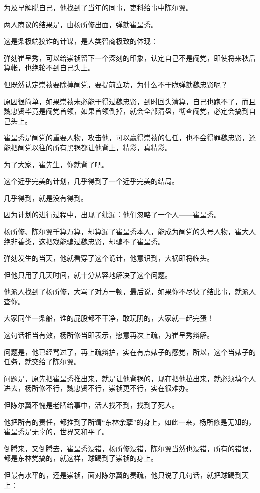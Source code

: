 \begin{multicols}{\theparacolNo}
为及早解脱自己，他找到了当年的同事，吏科给事中陈尔翼。

两人商议的结果是，由杨所修出面，弹劾崔呈秀。

这是条极端狡诈的计谋，是人类智商极致的体现：

弹劾崔呈秀，可以给崇祯留下一个深刻的印象，认定自己不是阉党，即使将来秋后算帐，也绝轮不到自己头上。

但既然认定崇祯要除掉阉党，要提前立功，为什么不干脆弹劾魏忠贤呢？

原因很简单，如果崇祯未必能干得过魏忠贤，到时回头清算，自己也跑不了，而且魏忠贤毕竟是阉党首领，如果首领倒掉，就会全部清盘，彻查阉党，必定会搞到自己头上。

崔呈秀是阉党的重要人物，攻击他，可以赢得崇祯的信任，也不会得罪魏忠贤，还能把阉党以往的所有黑锅都让他背上，精彩，真精彩。

为了大家，崔先生，你就背了吧。

这个近乎完美的计划，几乎得到了一个近乎完美的结局。

几乎得到，就是没有得到。

因为计划的进行过程中，出现了纰漏：他们忽略了一个人——崔呈秀。

杨所修、陈尔翼千算万算，却算漏了崔呈秀本人，能成为阉党的头号人物，崔大人绝非善类，这把戏能骗过魏忠贤，却骗不了崔呈秀。

弹劾发生的当天，他就看穿了这个诡计，他意识到，大祸即将临头。

但他只用了几天时间，就十分从容地解决了这个问题。

他派人找到了杨所修，大骂了对方一顿，最后说，如果你不尽快了结此事，就派人查你。

大家同坐一条船，谁的屁股都不干净，敢玩阴的，大家就一起完蛋！

这句话相当有效，杨所修当即表示，愿意再次上疏，为崔呈秀辩解。

问题是，他已经骂过了，再上疏辩护，实在有点婊子的感觉，所以，这个当婊子的任务，就交给了陈尔翼。

问题是，原先把崔呈秀推出来，就是让他背锅的，现在把他拉出来，就必须填个人进去，杨所修不行，魏忠贤不行，崇祯更不行，实在很难办。

但陈尔翼不愧是老牌给事中，活人找不到，找到了死人。

他把所有的责任，都推到了所谓“东林余孽”的身上，如此一来，杨所修是无知的，崔呈秀是无辜的，世界又和平了。

倒腾来，又倒腾去，崔呈秀没错，杨所修没错，陈尔翼当然也没错，所有的错误，都是东林党搞的，就这样，球踢到了崇祯的身上。

但最有水平的，还是崇祯，面对陈尔翼的奏疏，他只说了几句话，就把球踢到天上：


\end{multicols}
